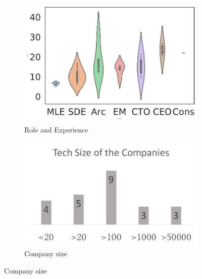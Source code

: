 
\begin{figure}[t]
\centering
    \begin{subfigure}[b]{0.23\textwidth}
         \centering
         \includegraphics[width=\textwidth]{images/exp.pdf}
         \caption{Role and Experience}
         \label{fig:role}
         \hfill
    \end{subfigure}
     \begin{subfigure}[b]{0.23\textwidth}
             \centering
         \includegraphics[width=\textwidth]{images/tech-size.pdf}
         \caption{Company size }
        \label{tab:company-size}
        \hfill
    \end{subfigure}


\end{figure}

